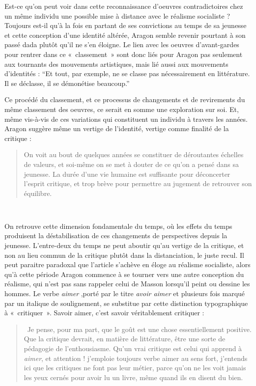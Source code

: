 	Est-ce qu’on peut voir dans cette reconnaissance d’oeuvres contradictoires chez un même individu une possible mise à distance avec le réalisme socialiste ? Toujours est-il qu’à la fois en partant de ses convictions au temps de sa jeunesse et cette conception d’une identité altérée, Aragon semble revenir pourtant à son passé dada plutôt qu’il ne s’en éloigne. Le lien avec les oeuvres d’avant-gardes pour rentrer dans ce « classement » sont donc liés pour Aragon pas seulement aux tournants des mouvements artistiques, mais lié aussi aux mouvements d’identités : \enquote{Et tout, par exemple, ne se classe pas nécessairement en littérature. Il se déclasse, il se démonétise beaucoup.}

Ce procédé du classement, et ce processus de changements et de revirements du même classement des oeuvres, ce serait en somme une exploration sur soi. Et, même vis-à-vis de ces variations qui constituent un individu à travers les années. Aragon suggère même un vertige de l’identité, vertige comme finalité de la critique : 

\begin{quote}
 On voit au bout de quelques années se constituer de déroutantes échelles de valeurs, et soi-même on se met à douter de ce qu’on a pensé dans sa jeunesse. La durée d’une vie humaine est suffisante pour déconcerter l’esprit critique, et trop brève pour permettre au jugement de retrouver son équilibre.   
\end{quote}
 

	 On retrouve cette dimension fondamentale du temps, où les effets du temps produisent la déstabilisation de ces changements de perspectives depuis la jeunesse. L’entre-deux du temps ne peut aboutir qu’au vertige de la critique, et non au lieu commun de la critique plutôt dans la distanciation, le juste recul. Il peut paraitre paradoxal que l’article s’achève en éloge au réalisme socialiste, alors qu’à cette période Aragon commence à se tourner vers une autre conception du réalisme, qui n’est pas sans rappeler celui de Masson lorsqu’il peint ou dessine les hommes. Le verbe \emph{aimer} ,porté par le titre \emph{avoir aimer} et plusieurs fois marqué par un italique de soulignement, se substitue par cette distinction typographique à « critiquer ». Savoir aimer, c’est savoir véritablement critiquer :  

     \begin{quote}
       Je pense, pour ma part, que le goût est une chose essentiellement positive. Que la critique devrait, en matière de littérature, être une sorte de pédagogie de l’enthousiasme. Qu’un vrai critique est celui qui apprend à \emph{aimer}, et attention ! j’emploie toujours verbe aimer au sens fort, j’entends ici que les critiques ne font pas leur métier, parce qu’on ne les voit jamais les yeux cernés pour avoir lu un livre, même quand ils en disent du bien.    
     \end{quote}


